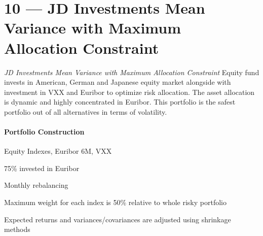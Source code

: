 \documentclass{scrreprt}
\begin{document}

\newpage\section*{10 --- JD Investments Mean Variance with Maximum Allocation Constraint}
\textit{JD Investments Mean Variance with Maximum Allocation Constraint} Equity fund invests in American, German and Japanese equity market alongside with investment in VXX and Euribor to optimize risk allocation. The asset allocation is dynamic and highly concentrated in Euribor. This portfolio is the safest portfolio out of all alternatives in terms of volatility.
%
\paragraph{Portfolio Construction}
\begin{sit}
\item	Equity Indexes, Euribor 6M, VXX
\item	75\% invested in Euribor
\item	Monthly rebalancing
\item	Maximum weight for each index is 50\% relative to whole risky portfolio
\item	Expected returns and variances/covariances are adjusted using shrinkage methods
\end{sit}
\end{document}
